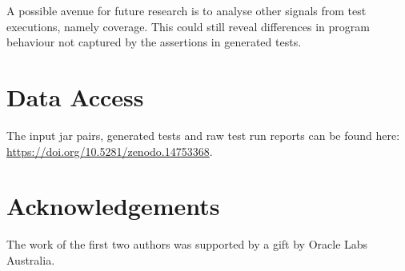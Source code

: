 \documentclass[conference]{IEEEtran}
\begin{document}
A possible avenue for future research is to analyse other signals from test executions, namely coverage. This could still reveal differences in program behaviour not captured by the assertions in generated tests. 



\section{Data Access}
\label{sec:dataaccess}

The input jar pairs, generated tests and raw test run reports can be found here: \url{https://doi.org/10.5281/zenodo.14753368}.

\section*{Acknowledgements}

The work of the first two authors was supported by a gift by Oracle Labs Australia.




\end{document}
